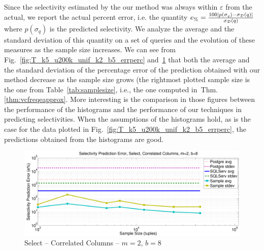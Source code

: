 Since the selectivity estimated by the our method was always within $\varepsilon$
from the actual, we report the actual percent error, i.e. the quantity
$e_\%=\frac{100|p(\sigma_q)-\sigma_{\cal D}(q)|}{\sigma_{\cal D}(q)}$ where $p(\sigma_q)$
is the predicted selectivity. We analyze the average and the standard deviation
of this quantity on a set of queries and the evolution of these measures as
the sample size increases. We can see from
Fig.~\ref{fig:T_k5_u200k_unif_k2_b5_errperc}
and~\ref{fig:T_k2_correl_k2_b8_errperc} that both the average and the standard
deviation of the percentage error of the prediction obtained with our method
decrease as the sample size grows (the rightmost plotted
sample size is the one from Table~\ref{tab:samplesize}, i.e., the one computed 
in~Thm.\ref{thm:vcfreqeapprox}. More interesting is the comparison in those figures between the performance of the
histograms and the performance of our techniques in predicting selectivities. When
the assumptions of the histograms hold, as is the case for the data plotted in
Fig.~\ref{fig:T_k5_u200k_unif_k2_b5_errperc}, the predictions obtained from the
histograms are good. 

\begin{figure}[ht]
  \centering
  \includegraphics[scale=0.35]{vcfreq/T_k2_correl_k2_b8_errperc}
  \caption{Select -- Correlated Columns -- $m=2$, $b=8$}
  \label{fig:T_k2_correl_k2_b8_errperc}
\end{figure}

